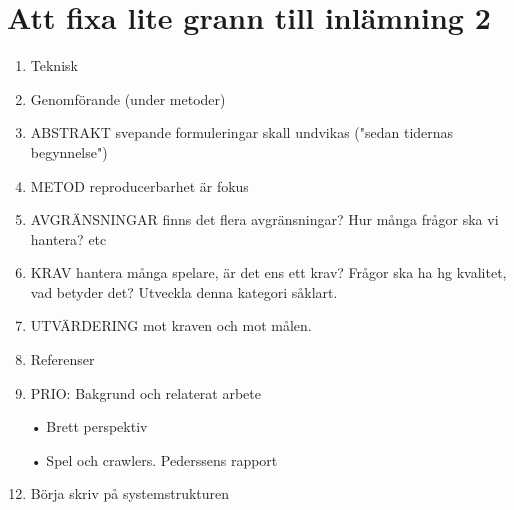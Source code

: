 \documentclass[a4paper,11pt]{article}
\begin{document}
\section{Att fixa lite grann till inlämning 2}

\begin{enumerate}
\item Teknisk 
\item Genomförande (under metoder)
\item ABSTRAKT svepande formuleringar skall undvikas ("sedan tidernas begynnelse")
\item METOD reproducerbarhet är fokus
\item AVGRÄNSNINGAR finns det flera avgränsningar? Hur många frågor ska vi hantera? etc
\item KRAV hantera många spelare, är det ens ett krav? Frågor ska ha hg kvalitet, vad betyder det? Utveckla denna kategori såklart.
\item UTVÄRDERING mot kraven och mot målen.
\item Referenser

\item PRIO: Bakgrund och relaterat arbete
\item[•] Brett perspektiv
\item[•] Spel och crawlers. Pederssens rapport
\item Börja skriv på systemstrukturen



\end{enumerate}
\end{document}
